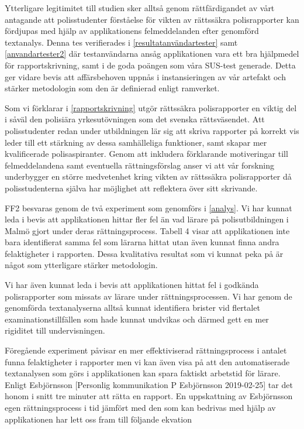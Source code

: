 \documentclass[swedish]{maucsthesis}
\begin{document}
Ytterligare legitimitet till studien sker alltså genom rättfärdigandet av vårt antagande att polisstudenter förståelse för vikten av rättssäkra polisrapporter kan fördjupas med hjälp av applikationens felmeddelanden efter genomförd textanalys. Denna tes verifierades i \cref{resultatanvändartester} samt \cref{anvandartester2} där testanvändarna ansåg applikationen vara ett bra hjälpmedel för rapportskrivning, samt i de goda poängen som våra SUS-test generade. Detta ger vidare bevis att affärsbehoven uppnås i instansieringen av vår artefakt och stärker metodologin som den är definierad enligt ramverket.

Som vi förklarar i \cref{rapportskrivning} utgör rättssäkra polisrapporter en viktig del i såväl den polisiära yrkesutövningen som det svenska rättsväsendet. Att polisstudenter redan under utbildningen lär sig att skriva rapporter på korrekt vis leder till ett stärkning av dessa samhälleliga funktioner, samt skapar mer kvalificerade polisaspiranter. Genom att inkludera förklarande motiveringar till felmeddelandena samt eventuella rättningsförslag anser vi att vår forskning underbygger en större medvetenhet kring vikten av rättssäkra polisrapporter då polisstudenterna själva har möjlighet att reflektera över sitt skrivande. 

FF2 besvaras genom de två experiment som genomförs i \cref{analys}. Vi har kunnat leda i bevis att applikationen hittar fler fel än vad lärare på polisutbildningen i Malmö gjort under deras rättningsprocess. Tabell 4 visar att applikationen inte bara identifierat samma fel som lärarna hittat utan även kunnat finna andra felaktigheter i rapporten. Dessa kvalitativa resultat som vi kunnat peka på är något som ytterligare stärker metodologin. 

Vi har även kunnat leda i bevis att applikationen hittat fel i godkända polisrapporter som missats av lärare under rättningsprocessen. Vi har genom de genomförda textanalyserna alltså kunnat identifiera brister vid flertalet examinationstillfällen som hade kunnat undvikas och därmed gett en mer rigiditet till undervisningen. 

Föregående experiment påvisar en mer effektiviserad rättningsprocess i antalet funna felaktigheter i rapporter men vi kan även visa på att den automatiserade textanalysen som görs i applikationen kan spara faktiskt arbetstid för lärare. Enligt Esbjörnsson [Personlig kommunikation
P Esbjörnsson 2019-02-25] tar det honom i snitt tre minuter att rätta en rapport. En uppskattning av Esbjörnsson egen rättningsprocess i tid jämfört med den som kan bedrivas med hjälp av applikationen har lett oss fram till följande ekvation 
\end{document}
